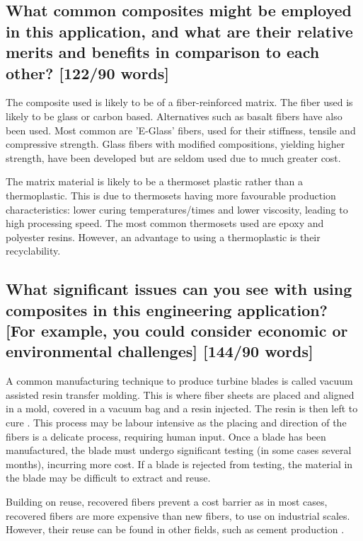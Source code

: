 \documentclass[12pt]{article}
\newcommand{\citeprimsec}[2]{\citep[][cited by \citealp{#2}]{#1}}
\numberwithin{equation}{section}
\begin{document}
\begin{flushleft}
\subsection{What common composites might be employed in this application, and what are their relative merits and benefits in comparison to each other? [122/90 words]}
The composite used is likely to be of a fiber-reinforced matrix. The fiber used is likely to be glass or carbon based. Alternatives such as basalt fibers have also been used. Most common are 'E-Glass' fibers, used for their stiffness, tensile and compressive strength. Glass fibers with modified compositions, yielding higher strength, have been developed but are seldom used due to much greater cost.

The matrix material is likely to be a thermoset plastic rather than a thermoplastic. This is due to thermosets having more favourable production characteristics: lower curing temperatures/times and lower viscosity, leading to high processing speed. The most common thermosets used are epoxy and polyester resins. However, an advantage to using a thermoplastic is their recyclability. \citeprimsec{windTurbineMaterial2}{windTurbineMaterial} 

\subsection{What significant issues can you see with using composites in this engineering application? [For 
example, you could consider economic or environmental
challenges] [144/90 words]}
A common manufacturing technique to produce turbine blades is called vacuum assisted resin transfer molding. This is where fiber sheets are placed and aligned in a mold, covered in a vacuum bag and a resin injected. The resin is then left to cure \citep{VARTM}. This process may be labour intensive as the placing and direction of the fibers is a delicate process, requiring human input. Once a blade has been manufactured, the blade must undergo significant testing (in some cases several months), incurring more cost. If a blade is rejected from testing, the material in the blade may be difficult to extract and reuse. 

Building on reuse, recovered fibers prevent a cost barrier as in most cases, recovered fibers are more expensive than new fibers, to use on industrial scales. However, their reuse can be found in other fields, such as cement production \citep{fiberCement}. 


\end{flushleft}
\end{document}
